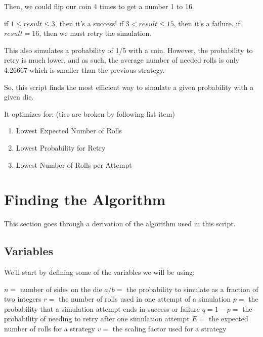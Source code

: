 \documentclass{article}
\begin{document}
Then, we could flip our coin 4 times to get a number 1 to 16.\newline

\noindent
if $1\leq result\leq 3$, then it's a success!\newline
if $3<result\leq 15$, then it's a failure.\newline
if $result=16$, then we must retry the simulation.\newline

This also simulates a probability of 1/5 with a coin. However, the probability to retry is much lower, and as such, the average number of needed rolls is only 4.26667 which is smaller than the previous strategy.\newline

So, this script finds the most efficient way to simulate a given probability with a given die.\newline

\noindent
It optimizes for: (ties are broken by following list item)\newline
\begin{enumerate}
    \item Lowest Expected Number of Rolls
    \item Lowest Probability for Retry
    \item Lowest Number of Rolls per Attempt
\end{enumerate}

\section{Finding the Algorithm}
This section goes through a derivation of the algorithm used in this script.

\subsection{Variables}
We'll start by defining some of the variables we will be using:\newline

\noindent
$n=$ number of sides on the die \newline
$a/b=$ the probability to simulate as a fraction of two integers\newline
$r=$ the number of rolls used in one attempt of a simulation\newline
$p=$ the probability that a simulation attempt ends in success or failure\newline
$q=1-p=$ the probability of needing to retry after one simulation attempt\newline
$E=$ the expected number of rolls for a strategy\newline
$v=$ the scaling factor used for a strategy
\end{document}
